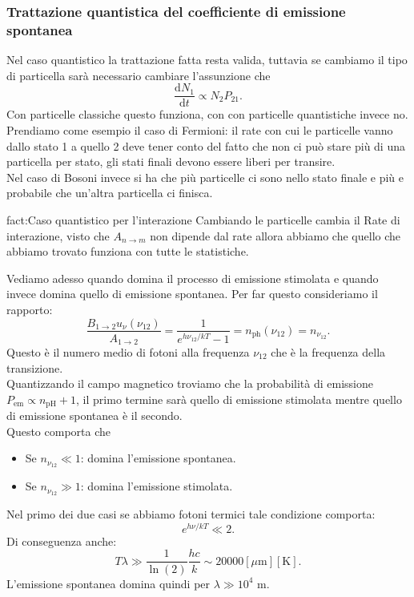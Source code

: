 \subsubsection{Trattazione quantistica del coefficiente di emissione spontanea}%
Nel caso quantistico la trattazione fatta resta valida, tuttavia se cambiamo il tipo di particella sarà necessario cambiare l'assunzione che 
\[
\frac{\text{d} N_1}{\text{d} t} \propto N_{2}P_{21}
.\]   
Con particelle classiche questo funziona, con con particelle quantistiche invece no. \\
Prendiamo come esempio il caso di Fermioni: il rate con cui le particelle vanno dallo stato 1 a quello 2 deve tener conto del fatto che non ci può stare più di una particella per stato, gli stati finali devono essere liberi per transire.\\
Nel caso di Bosoni invece si ha che più particelle ci sono nello stato finale e più e probabile che un'altra particella ci finisca.
\begin{fact}{fact:Caso quantistico per l'interazione}
Cambiando le particelle cambia il Rate di interazione, visto che $A_{n\to m}$ non dipende dal rate allora abbiamo che quello che abbiamo trovato funziona con tutte le statistiche.
\end{fact}
Vediamo adesso quando domina il processo di emissione stimolata e quando invece domina quello di emissione spontanea. Per far questo consideriamo il rapporto:
\[
    \frac{B_{1\to 2}u_\nu(\nu_{12})}{A_{1\to 2}} = \frac{1}{e^{h\nu_{12} /kT}-1}
    = n_\text{ph}(\nu_{12}) = n_{\nu_{12}}
.\] 
Questo è il numero medio di fotoni alla frequenza $\nu_{12}$  che è la frequenza della transizione.\\
Quantizzando il campo magnetico troviamo che la probabilità di emissione $P_\text{em} \propto n_\text{pH} + 1$, il primo termine sarà quello di emissione stimolata mentre quello di emissione spontanea è il secondo.\\
Questo comporta che 
\begin{itemize}
    \item Se $n_{\nu_{12}}\ll 1$: domina l'emissione spontanea.
    \item Se $n_{\nu_{12}}\gg 1$: domina l'emissione stimolata.
\end{itemize}
Nel primo dei due casi se abbiamo fotoni termici tale condizione comporta:
\[
e^{h\nu /kT}\ll 2
.\] 
Di conseguenza anche:
\[
    T\lambda\gg \frac{1}{\ln(2)}\frac{hc}{k}\sim 20000 [\mu\text{m}][\text{K}]
.\] 
L'emissione spontanea domina quindi per $\lambda\gg 10^4$ m.\\
